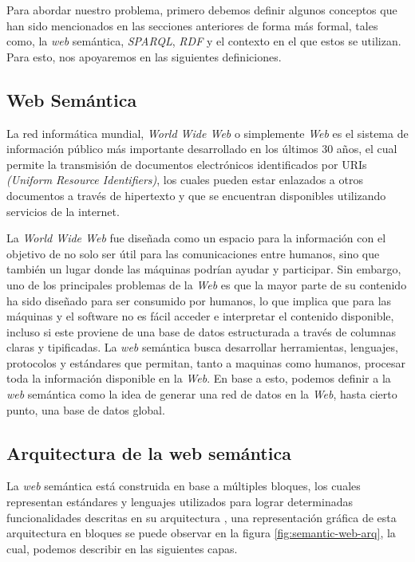 
Para abordar nuestro problema, primero debemos definir algunos conceptos que han
sido mencionados en las secciones anteriores de forma más formal, tales como, la
\textit{web} semántica, \textit{SPARQL}, \textit{RDF} y el contexto en el que
estos se utilizan. Para esto, nos apoyaremos en las siguientes definiciones.

\subsection{Web Semántica}

La red informática mundial, \textit{World Wide Web} o simplemente \textit{Web}
es el sistema de información público más importante desarrollado en los últimos
30 años, el cual permite la transmisión de documentos electrónicos identificados
por URIs \textit{(Uniform Resource Identifiers)}, los cuales pueden estar
enlazados a otros documentos a través de hipertexto y que se encuentran
disponibles utilizando servicios de la internet.

La \textit{World Wide Web} fue diseñada como un espacio para la información con
el objetivo de no solo ser útil para las comunicaciones entre humanos, sino que
también un lugar donde las máquinas podrían ayudar y participar. Sin embargo,
uno de los principales problemas de la \textit{Web} es que la mayor parte de su
contenido ha sido diseñado para ser consumido por humanos, lo que implica que
para las máquinas y el software no es fácil acceder e interpretar el contenido
disponible, incluso si este proviene de una base de datos estructurada a través
de columnas claras y tipificadas. La \textit{web} semántica busca desarrollar
herramientas, lenguajes, protocolos y estándares que permitan, tanto a maquinas
como humanos, procesar toda la información disponible en la \textit{Web}. En
base a esto, podemos definir a la \textit{web} semántica como la idea de generar
una red de datos en la \textit{Web}, hasta cierto punto, una base de datos
global.
\cite{berners1998semantic}

\subsection{Arquitectura de la web semántica}

La \textit{web} semántica está construida en base a múltiples bloques, los
cuales representan estándares y lenguajes utilizados para lograr determinadas
funcionalidades descritas en su arquitectura \cite{harth2011semantic}, una
representación gráfica de esta arquitectura en bloques se puede observar en la
figura \ref{fig:semantic-web-arq}, la cual, podemos describir en las siguientes
capas.

